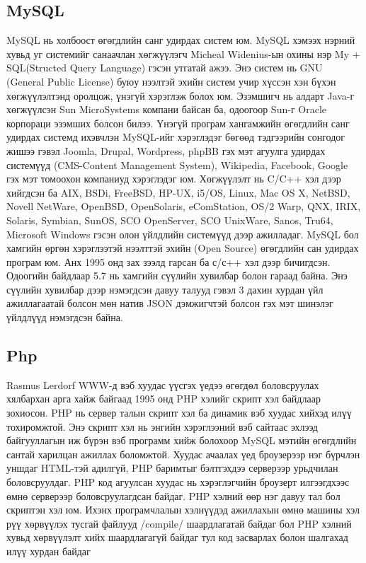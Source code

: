 \subsection{MySQL}
MySQL нь холбоост өгөгдлийн санг удирдах систем юм. MySQL хэмээх нэрний хувьд уг системийг санаачлан хөгжүүлэгч Micheal Widenius-ын охины нэр My + SQL(Structed Query Language) гэсэн утгатай ажээ.
Энэ систем нь GNU (General Public License) буюу нээлтэй эхийн систем учир хүссэн хэн бүхэн хөгжүүлэлтэнд оролцож, үнэгүй хэрэглэж болох юм. Эзэмшигч нь алдарт Java-г хөгжүүлсэн Sun MicroSystems компани байсан ба, одоогоор Sun-г Oracle корпораци эзэмших болсон билээ.
Үнэгүй програм хангамжийн өгөгдлийн санг удирдах системд ихэвчлэн MySQL-ийг хэрэглэдэг бөгөөд тэдгээрийн сонгодог жишээ гэвэл Joomla, Drupal, Wordpress, phpBB гэх мэт агуулга удирдах системүүд (CMS-Content Management System), Wikipedia, Facebook, Google гэх мэт томоохон компаниуд хэрэглэдэг юм.
Хөгжүүлэлт нь C/C++ хэл дээр хийгдсэн ба AIX, BSDi, FreeBSD, HP-UX, i5/OS, Linux, Mac OS X, NetBSD, Novell NetWare, OpenBSD, OpenSolaris, eComStation, OS/2 Warp, QNX, IRIX, Solaris, Symbian, SunOS, SCO OpenServer, SCO UnixWare, Sanos, Tru64, Microsoft Windows гэсэн олон үйлдлийн системүүд дээр ажилладаг.
MySQL бол хамгийн өргөн хэрэглээтэй нээлттэй эхийн (Open Source) өгөгдлийн сан удирдах програм юм. Анх 1995 онд зах зээлд гарсан ба с/с++ хэл дээр бичигдсэн. Одоогийн байдлаар 5.7 нь хамгийн сүүлийн хувилбар болон гараад байна. Энэ сүүлийн хувилбар дээр нэмэгдсэн давуу талууд гэвэл 3 дахин хурдан үйл ажиллагаатай болсон мөн натив JSON дэмжигчтэй болсон гэх мэт шинэлэг үйлдлүүд нэмэгдсэн байна.

\subsection{Php}
  Rasmus Lerdorf WWW-д вэб хуудас үүсгэх үедээ өгөгдөл боловсруулах хялбархан арга хайж байгаад 1995 онд PHP хэлийг скрипт хэл байдлаар зохиосон.
PHP нь сервер талын скрипт хэл ба динамик вэб хуудас хийхэд илүү тохиромжтой. Энэ скрипт хэл нь энгийн хэрэглээний вэб сайтаас эхлээд байгууллагын иж бүрэн вэб программ хийж болохоор MySQL мэтийн өгөгдлийн сантай харилцан ажиллах боломжтой.
Хуудас ачаалах үед броузерээр нэг бүрчлэн уншдаг HTML-тэй адилгүй, PHP баримтыг бэлтгэхдээ серверээр урьдчилан боловсруулдаг. PHP код агуулсан хуудас нь хэрэглэгчийн броузерт илгээгдхээс өмнө серверээр боловсруулагдсан байдаг.
PHP хэлний өөр нэг давуу тал бол скриптэн хэл юм. Ихэнх програмчлалын хэлнүүдэд ажиллахын өмнө машины хэл рүү хөрвүүлэх тусгай файлууд /compile/ шаардлагатай байдаг бол PHP хэлний хувьд хөрвүүлэлт хийх шаардлагагүй байдаг тул код засварлах болон шалгахад илүү хурдан байдаг

